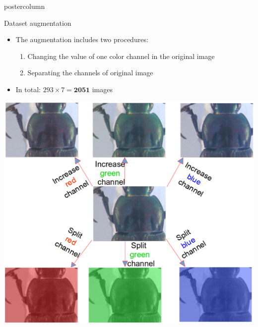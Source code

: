 \begin{frame}
\begin{columns}
\begin{column}{.53\textwidth}
\begin{beamercolorbox}[center,wd=\textwidth]{postercolumn}
\begin{minipage}[T]{.95\textwidth}
{            \vfill            
            \begin{block}{Dataset augmentation}
            	\begin{itemize}
            		\item[] The augmentation includes two procedures:
            			\begin{enumerate}
            				\item Changing the value of one color channel in the original image
            				\item Separating the channels of original image	
			           	\end{enumerate}
					\item[] In total: $293 \times 7 = \textbf{2051}$ images 
            	\end{itemize}
            \centering
            
            \includegraphics[width=.5\textwidth]{images/data_aug.eps}
            \end{block}
            
}
\end{minipage}
\end{beamercolorbox}
\end{column}
\end{columns}
\end{frame}
